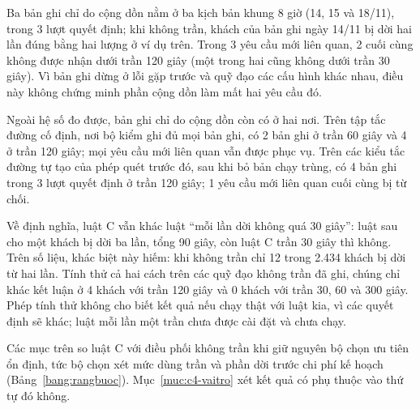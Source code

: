Ba bản ghi chỉ do cộng dồn nằm ở ba kịch bản khung 8 giờ (14, 15 và 18/11), trong 3 lượt quyết định; khi không trần,
khách của bản ghi ngày 14/11 bị dời hai lần đúng bằng hai lượng ở ví dụ trên. Trong 3 yêu cầu mới liên quan, 2 cuối
cùng không được nhận dưới trần 120 giây (một trong hai cũng không dưới trần 30 giây). Vì bản ghi dừng ở lỗi gặp trước
và quỹ đạo các cấu hình khác nhau, điều này không chứng minh phần cộng dồn làm mất hai yêu cầu đó.

Ngoài hệ số đo được, bản ghi chỉ do cộng dồn còn có ở hai nơi. Trên tập tắc đường cố định, nơi bộ kiểm ghi đủ mọi bản
ghi, có 2 bản ghi ở trần 60 giây và 4 ở trần 120 giây; mọi yêu cầu mới liên quan vẫn được phục vụ. Trên các kiểu tắc
đường tự tạo của phép quét trước đó, sau khi bỏ bản chạy trùng, có 4 bản ghi trong 3 lượt quyết định ở trần 120 giây;
1 yêu cầu mới liên quan cuối cùng bị từ chối.

Về định nghĩa, luật C vẫn khác luật ``mỗi lần dời không quá 30 giây'': luật sau cho một khách bị dời ba lần, tổng 90
giây, còn luật C trần 30 giây thì không. Trên số liệu, khác biệt này hiếm: khi không trần chỉ 12 trong 2.434 khách bị
dời từ hai lần. Tính thử cả hai cách trên các quỹ đạo không trần đã ghi, chúng chỉ khác kết luận ở 4 khách với trần
120 giây và 0 khách với trần 30, 60 và 300 giây. Phép tính thử không cho biết kết quả nếu chạy thật với luật kia, vì
các quyết định sẽ khác; luật mỗi lần một trần chưa được cài đặt và chưa chạy.

Các mục trên so luật C với điều phối không trần khi giữ nguyên bộ chọn ưu tiên ổn định, tức bộ chọn xét mức dùng trần
và phần dời trước chi phí kế hoạch (Bảng~\ref{bang:rangbuoc}). Mục~\ref{muc:c4-vaitro} xét kết quả có phụ thuộc vào
thứ tự đó không.
